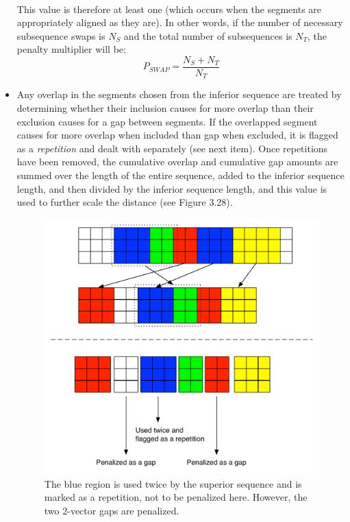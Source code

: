 \documentclass[a4paper,12pt]{report} 	%
\numberwithin{figure}{chapter}
\numberwithin{table}{chapter}
\numberwithin{equation}{chapter}
\begin{document}
\begin{flushleft}
\begin{itemize}
\begin{figure}[h!]
\end{figure}
\\
This value is therefore at least one (which occurs when the segments are appropriately aligned as they are). In other words, if the number of necessary subsequence swaps is $N_S$ and the total number of subsequences is $N_T$, the penalty multiplier will be:
\begin{equation}
P_{SWAP} = \frac{N_S+N_T}{N_T}
\end{equation}
\item Any overlap in the segments chosen from the inferior sequence are treated by determining whether their inclusion causes for more overlap than their exclusion causes for a gap between segments. If the overlapped segment causes for more overlap when included than gap when excluded, it is flagged as a \emph{repetition} and dealt with separately (see next item). Once repetitions have been removed, the cumulative overlap and cumulative gap amounts are summed over the length of the entire sequence, added to the inferior sequence length, and then divided by the inferior sequence length, and this value is used to further scale the distance (see Figure 3.28). 
\begin{figure}[h!]
\begin{center}
\includegraphics[scale=0.7]{Penalty_2}
\caption[Penalizing Overlaps and Gaps]{The blue region is used twice by the superior sequence and is marked as a repetition, not to be penalized here. However, the two 2-vector gaps are penalized.}

\end{center}
\end{figure}
\end{itemize}
\end{flushleft}
\end{document}
